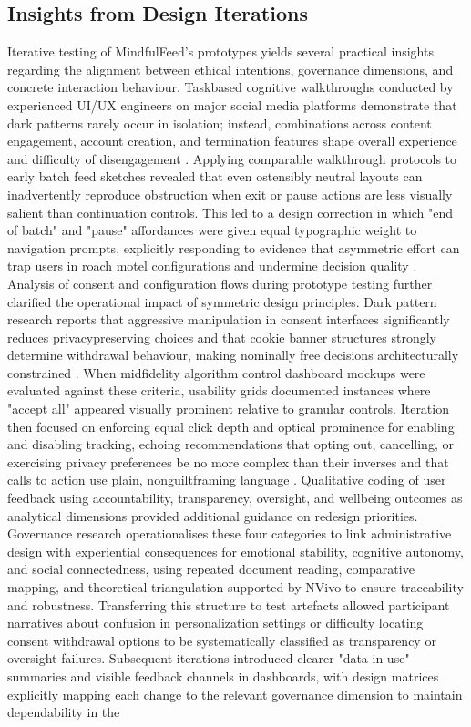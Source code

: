 \documentclass{article}
\begin{document}
\subsection{Insights from Design Iterations}
\label{sec:insights_design_iterations} Iterative testing of MindfulFeed's prototypes yields several practical insights regarding the alignment between ethical intentions, governance dimensions, and concrete interaction behaviour. Task\-based cognitive walkthroughs conducted by experienced UI/UX engineers on major social media platforms demonstrate that dark patterns rarely occur in isolation; instead, combinations across content engagement, account creation, and termination features shape overall experience and difficulty of disengagement \parencites[3]{4692551}. Applying comparable walkthrough protocols to early batch feed sketches revealed that even ostensibly neutral layouts can inadvertently reproduce obstruction when exit or pause actions are less visually salient than continuation controls. This led to a design correction in which "end of batch" and "pause" affordances were given equal typographic weight to navigation prompts, explicitly responding to evidence that asymmetric effort can trap users in roach motel configurations and undermine decision quality \parencites[2]{4807303}[3]{4692551}. Analysis of consent and configuration flows during prototype testing further clarified the operational impact of symmetric design principles. Dark pattern research reports that aggressive manipulation in consent interfaces significantly reduces privacy\-preserving choices and that cookie banner structures strongly determine withdrawal behaviour, making nominally free decisions architecturally constrained \parencites[2]{4807303}. When mid\-fidelity algorithm control dashboard mockups were evaluated against these criteria, usability grids documented instances where "accept all" appeared visually prominent relative to granular controls. Iteration then focused on enforcing equal click depth and optical prominence for enabling and disabling tracking, echoing recommendations that opting out, cancelling, or exercising privacy preferences be no more complex than their inverses and that calls to action use plain, non\-guilt\-framing language \parencites[8]{4807303}. Qualitative coding of user feedback using accountability, transparency, oversight, and well\-being outcomes as analytical dimensions provided additional guidance on redesign priorities. Governance research operationalises these four categories to link administrative design with experiential consequences for emotional stability, cognitive autonomy, and social connectedness, using repeated document reading, comparative mapping, and theoretical triangulation supported by NVivo to ensure traceability and robustness. Transferring this structure to test artefacts allowed participant narratives about confusion in personalization settings or difficulty locating consent withdrawal options to be systematically classified as transparency or oversight failures. Subsequent iterations introduced clearer "data in use" summaries and visible feedback channels in dashboards, with design matrices explicitly mapping each change to the relevant governance dimension to maintain dependability in the 
\end{document}
